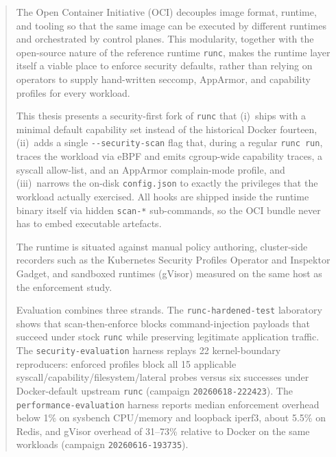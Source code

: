\begin{abstract}
The Open Container Initiative (OCI) decouples image format, runtime, and tooling so that the same image can be executed by different runtimes and orchestrated by control planes. This modularity, together with the open-source nature of the reference runtime \texttt{runc}, makes the runtime layer itself a viable place to enforce security defaults, rather than relying on operators to supply hand-written seccomp, AppArmor, and capability profiles for every workload.

This thesis presents a security-first fork of \texttt{runc} that (i)~ships with a minimal default capability set instead of the historical Docker fourteen, (ii)~adds a single \texttt{-{}-security-scan} flag that, during a regular \texttt{runc run}, traces the workload via eBPF and emits cgroup-wide capability traces, a syscall allow-list, and an AppArmor complain-mode profile, and (iii)~narrows the on-disk \texttt{config.json} to exactly the privileges that the workload actually exercised. All hooks are shipped inside the runtime binary itself via hidden \texttt{scan-*} sub-commands, so the OCI bundle never has to embed executable artefacts.

The runtime is situated against manual policy authoring, cluster-side recorders such as the Kubernetes Security Profiles Operator and Inspektor Gadget, and sandboxed runtimes (gVisor) measured on the same host as the enforcement study.

Evaluation combines three strands. The \texttt{runc-hardened-test} laboratory shows that scan-then-enforce blocks command-injection payloads that succeed under stock \texttt{runc} while preserving legitimate application traffic. The \texttt{security-evaluation} harness replays 22 kernel-boundary reproducers: enforced profiles block all 15 applicable syscall/capability/filesystem/lateral probes versus six successes under Docker-default upstream \texttt{runc} (campaign \texttt{20260618-222423}). The \texttt{performance-evaluation} harness reports median enforcement overhead below 1\% on sysbench CPU/memory and loopback iperf3, about 5.5\% on Redis, and gVisor overhead of 31--73\% relative to Docker on the same workloads (campaign \texttt{20260616-193735}).
\end{abstract}
